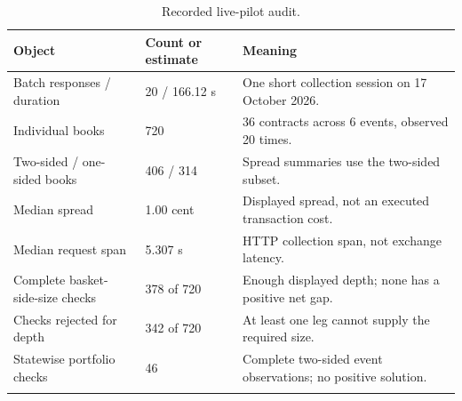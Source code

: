 \begin{table}[htbp]\centering
{\fontsize{9.6}{12}\selectfont\renewcommand{\arraystretch}{1.18}\setlength{\tabcolsep}{4pt}
\begin{tabularx}{\linewidth}{@{}L{64mm}L{33mm}X@{}}\toprule{}
\textbf{Object} & \textbf{Count or estimate} & \textbf{Meaning} \\ \midrule
Batch responses / duration & 20 / 166.12 s & One short collection session on 17 October 2026. \\ \hline
Individual books & 720 & 36 contracts across 6 events, observed 20 times. \\ \hline
Two-sided / one-sided books & 406 / 314 & Spread summaries use the two-sided subset. \\ \hline
Median spread & 1.00 cent & Displayed spread, not an executed transaction cost. \\ \hline
Median request span & 5.307 s & HTTP collection span, not exchange latency. \\ \hline
Complete basket-side-size checks & 378 of 720 & Enough displayed depth; none has a positive net gap. \\ \hline
Checks rejected for depth & 342 of 720 & At least one leg cannot supply the required size. \\ \hline
Statewise portfolio checks & 46 & Complete two-sided event observations; no positive solution. \\ \hline
{}\bottomrule\end{tabularx}}
\caption[Recorded live-pilot audit]{Recorded live-pilot audit.}\label{tab:live}
\end{table}
